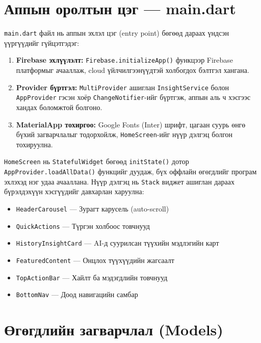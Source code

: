 \section{Аппын оролтын цэг — main.dart}

\texttt{main.dart} файл нь аппын эхлэл цэг (entry point) бөгөөд дараах үндсэн үүргүүдийг гүйцэтгэдэг:

\begin{enumerate}
	\item \textbf{Firebase эхлүүлэлт:} \texttt{Firebase.initializeApp()} функцээр Firebase платформыг ачааллаж, cloud үйлчилгээнүүдтэй холбогдох бэлтгэл хангана.
	\item \textbf{Provider бүртгэл:} \texttt{MultiProvider} ашиглан \texttt{InsightService} болон \texttt{AppProvider} гэсэн хоёр \texttt{ChangeNotifier}-ийг бүртгэж, аппын аль ч хэсгээс хандах боломжтой болгоно.
	\item \textbf{MaterialApp тохиргоо:} Google Fonts (Inter) шрифт, цагаан суурь өнгө бүхий загварчлалыг тодорхойлж, \texttt{HomeScreen}-ийг нүүр дэлгэц болгон тохируулна.
\end{enumerate}

\texttt{HomeScreen} нь \texttt{StatefulWidget} бөгөөд \texttt{initState()} дотор \texttt{AppProvider.loadAllData()} функцийг дуудаж, бүх оффлайн өгөгдлийг програм эхлэхэд нэг удаа ачааллана. Нүүр дэлгэц нь \texttt{Stack} виджет ашиглан дараах бүрэлдэхүүн хэсгүүдийг давхарлан харуулна:

\begin{itemize}
	\item \texttt{HeaderCarousel} — Зурагт карусель (auto-scroll)
	\item \texttt{QuickActions} — Түргэн холбоос товчнууд
	\item \texttt{HistoryInsightCard} — AI-д суурилсан түүхийн мэдлэгийн карт
	\item \texttt{FeaturedContent} — Онцлох түүхүүдийн жагсаалт
	\item \texttt{TopActionBar} — Хайлт ба мэдэгдлийн товчнууд
	\item \texttt{BottomNav} — Доод навигацийн самбар
\end{itemize}

\section{Өгөгдлийн загварчлал (Models)}

